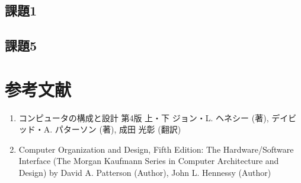 \documentclass[a4j]{jarticle}
\begin{document}
\subsection{課題1}






\subsection{課題5}





%
%

\section{参考文献}

\begin{enumerate}
\item コンピュータの構成と設計 第4版 上・下 ジョン・L. ヘネシー (著), デイビッド・A. パターソン (著), 成田 光彰 (翻訳)
\item Computer Organization and Design, Fifth Edition: The Hardware/Software Interface (The Morgan Kaufmann Series in Computer Architecture and Design) by David A. Patterson (Author), John L. Hennessy  (Author)
\end{enumerate}
\end{document}
